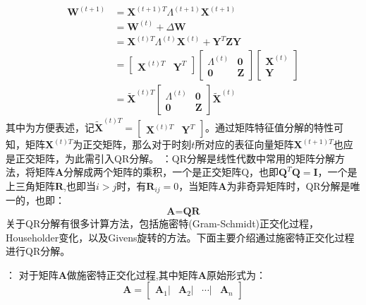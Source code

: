 \begin{equation}\label{time_t1}
\begin{aligned}
\textbf{W}^{(t+1)} &= \textbf{X}^{(t+1)T} \Lambda^{(t+1)} \textbf{X} ^{(t+1)} \\
 &= \textbf{W}^{(t)} + \Delta \textbf{W} \\
&= \textbf{X}^{(t)T} \Lambda^{(t)} \textbf{X} ^{(t)} +  \textbf{Y}^{T} \textbf{Z}  \textbf{Y} \\
&= \begin{bmatrix} \textbf{X}^{(t)T} & \textbf{Y}^{T}\end{bmatrix}
   \begin{bmatrix}  \Lambda^{(t)} & \textbf{0}\\
   \textbf{0} & \textbf{Z}
   \end{bmatrix}
   \begin{bmatrix} \textbf{X}^{(t)} \\ \textbf{Y}\end{bmatrix} \\
&= \tilde{\textbf{X}}^{(t)T} 
\begin{bmatrix}  \Lambda^{(t)} & \textbf{0}\\
\textbf{0} & \textbf{Z}
\end{bmatrix}
\tilde{\textbf{X}}^{(t)}
\end{aligned}
\end{equation}
其中为方便表述，记$ \tilde{\textbf{X}}^{(t)T}= \begin{bmatrix} \textbf{X}^{(t)T} & \textbf{Y}^{T}\end{bmatrix}$。通过矩阵特征值分解的特性可知，矩阵$\textbf{X}^{(t)T}$为正交矩阵，那么对于时刻$t$所对应的表征向量矩阵$\textbf{X}^{(t+1)T}$也应是正交矩阵，为此需引入QR分解。
：QR分解是线性代数中常用的矩阵分解方法，将矩阵$\textbf{A}$分解成两个矩阵的乘积，一个是正交矩阵$\text{Q}$，也即$\textbf{Q}^T\textbf{Q} = \textbf{I}$，一个是上三角矩阵$\textbf{R}$,也即当$i>j$时，有$\textbf{R}_{ij} =0$，当矩阵$\textbf{A}$为非奇异矩阵时，QR分解是唯一的，也即：
\begin{equation}
	\textbf{A} = \textbf{Q} \textbf{R}
\end{equation}
关于QR分解有很多计算方法，包括施密特(Gram-Schmidt)正交化过程，Householder变化，以及Givens旋转的方法。下面主要介绍通过施密特正交化过程进行QR分解。

：
对于矩阵$\textbf{A}$做施密特正交化过程,其中矩阵$\textbf{A}$原始形式为：
\begin{equation}
	\textbf{A} = \begin{bmatrix} \textbf{A}_1 | & \textbf{A}_2 | & \cdots | & \textbf{A}_n \end{bmatrix}
\end{equation}

